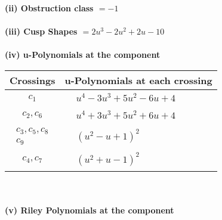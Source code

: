 \documentclass[1p]{elsarticle_modified}
\theoremstyle{definition}
\begin{document}
\flushleft \textbf{(ii) Obstruction class $= -1$}\\~\\
\flushleft \textbf{(iii) Cusp Shapes $= 2 u^3-2 u^2+2 u-10$}\\~\\
\newpage\renewcommand{\arraystretch}{1}
\flushleft \textbf{(iv) u-Polynomials at the component}\newline \\
\begin{tabular}{m{50pt}|m{274pt}}
Crossings & \hspace{64pt}u-Polynomials at each crossing \\
\hline $$\begin{aligned}c_{1}\end{aligned}$$&$\begin{aligned}
&u^4-3 u^3+5 u^2-6 u+4
\end{aligned}$\\
\hline $$\begin{aligned}c_{2},c_{6}\end{aligned}$$&$\begin{aligned}
&u^4+3 u^3+5 u^2+6 u+4
\end{aligned}$\\
\hline $$\begin{aligned}c_{3},c_{5},c_{8}\\c_{9}\end{aligned}$$&$\begin{aligned}
&(u^2- u+1)^2
\end{aligned}$\\
\hline $$\begin{aligned}c_{4},c_{7}\end{aligned}$$&$\begin{aligned}
&(u^2+u-1)^2
\end{aligned}$\\
\hline
\end{tabular}\\~\\
\newpage\renewcommand{\arraystretch}{1}
\flushleft \textbf{(v) Riley Polynomials at the component}\newline \\
\end{document}
